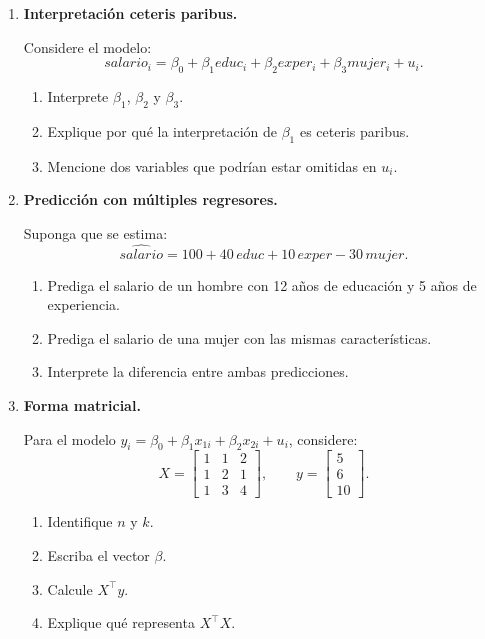 \documentclass[11pt]{article}
\begin{document}
\begin{enumerate}[label=\textbf{Ejercicio \arabic*.}, leftmargin=*]

\item \textbf{Interpretación ceteris paribus.}

Considere el modelo:
\[
salario_i=\beta_0+\beta_1 educ_i+\beta_2 exper_i+\beta_3 mujer_i+u_i.
\]

\begin{enumerate}[label=\alph*)]
    \item Interprete \(\beta_1\), \(\beta_2\) y \(\beta_3\).
    \item Explique por qué la interpretación de \(\beta_1\) es ceteris paribus.
    \item Mencione dos variables que podrían estar omitidas en \(u_i\).
\end{enumerate}

\item \textbf{Predicción con múltiples regresores.}

Suponga que se estima:
\[
\widehat{salario}=100+40\,educ+10\,exper-30\,mujer.
\]

\begin{enumerate}[label=\alph*)]
    \item Prediga el salario de un hombre con 12 años de educación y 5 años de experiencia.
    \item Prediga el salario de una mujer con las mismas características.
    \item Interprete la diferencia entre ambas predicciones.
\end{enumerate}

\item \textbf{Forma matricial.}

Para el modelo \(y_i=\beta_0+\beta_1x_{1i}+\beta_2x_{2i}+u_i\), considere:
\[
X=\begin{bmatrix}
1 & 1 & 2\\
1 & 2 & 1\\
1 & 3 & 4
\end{bmatrix},
\qquad
y=\begin{bmatrix}
5\\
6\\
10
\end{bmatrix}.
\]

\begin{enumerate}[label=\alph*)]
    \item Identifique \(n\) y \(k\).
    \item Escriba el vector \(\beta\).
    \item Calcule \(X^\top y\).
    \item Explique qué representa \(X^\top X\).
\end{enumerate}


\end{enumerate}
\end{document}
